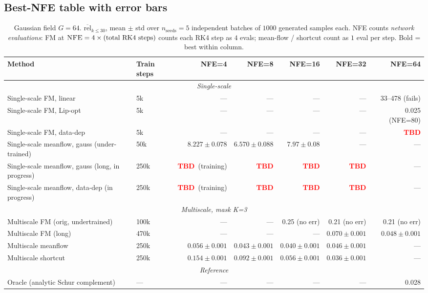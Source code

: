 \documentclass[11pt]{article}
\newcommand{\TBD}{\textcolor{red}{\textbf{TBD}}}
\newcommand{\NFE}{\textsc{NFE}}
\newcommand{\meanrel}{\overline{\text{rel}}}
\begin{document}
\subsection{Best-NFE table with error bars}
\label{sec:gf-table}

\begin{table}[ht]
\centering
\small
\caption{Gaussian field $G=64$. $\meanrel_{k\leq 30}$, mean $\pm$ std over $n_{\text{seeds}}=5$ independent batches of $1000$ generated samples each. NFE counts \emph{network evaluations}: FM at $\NFE = 4 \times \text{(total RK4 steps)}$ counts each RK4 step as $4$ evals; mean-flow / shortcut count as $1$ eval per step. Bold = best within column.}
\label{tab:gf-best}
\begin{tabular}{@{}llrrrrr@{}}
\toprule
Method & Train steps & NFE=4 & NFE=8 & NFE=16 & NFE=32 & NFE=64 \\
\midrule
\multicolumn{7}{c}{\textit{Single-scale}} \\
\midrule
Single-scale FM, linear & 5k & --- & --- & --- & --- & 33--478 (fails) \\
Single-scale FM, Lip-opt~\cite{chen2025scale} & 5k & --- & --- & --- & --- & 0.025 (NFE=80) \\
Single-scale FM, data-dep & 5k & --- & --- & --- & --- & \TBD \\
Single-scale meanflow, gauss (under-trained) & 50k & $8.227\pm 0.078$ & $6.570\pm 0.088$ & $7.97\pm 0.08$ & --- & --- \\
Single-scale meanflow, gauss (long, in progress) & 250k & \TBD\ (training) & \TBD & \TBD & \TBD & --- \\
Single-scale meanflow, data-dep (in progress) & 250k & \TBD\ (training) & \TBD & \TBD & \TBD & --- \\
\midrule
\multicolumn{7}{c}{\textit{Multiscale, mask K=3}} \\
\midrule
Multiscale FM (orig, undertrained) & 100k & --- & --- & 0.25 (no err) & 0.21 (no err) & 0.21 (no err) \\
Multiscale FM (long) & 470k & --- & --- & --- & $0.070 \pm 0.001$ & $\mathbf{0.048 \pm 0.001}$ \\
Multiscale meanflow & 250k & $0.056\pm 0.001$ & $\mathbf{0.043 \pm 0.001}$ & $\mathbf{0.040 \pm 0.001}$ & $0.046\pm 0.001$ & --- \\
Multiscale shortcut & 250k & $0.154\pm 0.001$ & $0.092\pm 0.001$ & $0.056\pm 0.001$ & $\mathbf{0.036\pm 0.001}$ & --- \\
\midrule
\multicolumn{7}{c}{\textit{Reference}} \\
\midrule
Oracle (analytic Schur complement) & --- & --- & --- & --- & --- & 0.028 \\
\bottomrule
\end{tabular}
\end{table}
\end{document}
